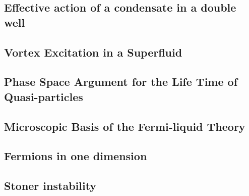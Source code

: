 \subsection{Effective action of a condensate in a double well}

\newpage
\subsection{Vortex Excitation in a Superfluid}




\newpage
\setcounter{section}{10}
\setcounter{subsection}{0}
\subsection{Phase Space Argument for the Life Time of Quasi-particles}

\subsection{Microscopic Basis of the Fermi-liquid Theory}










\setcounter{section}{12}
\setcounter{subsection}{0}
\subsection{Fermions in one dimension}







\newpage













\setcounter{section}{13}
\setcounter{subsection}{0}


\newpage
\subsection{Stoner instability}


